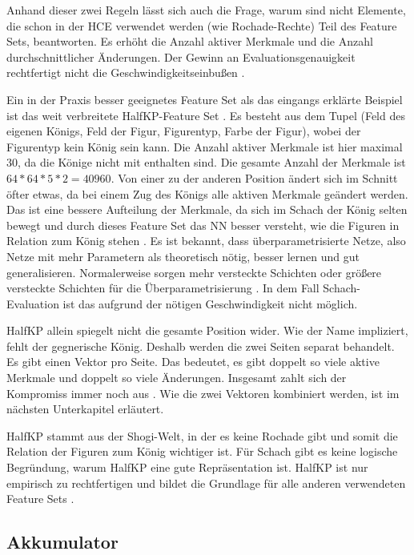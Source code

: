 Anhand dieser zwei Regeln lässt sich auch die Frage, warum sind nicht Elemente, die schon in der \ac{HCE} verwendet werden (wie \zb{} Rochade-Rechte) Teil des Feature Sets, beantworten. Es erhöht die Anzahl aktiver Merkmale und die Anzahl durchschnittlicher Änderungen. Der Gewinn an Evaluationsgenauigkeit rechtfertigt nicht die Geschwindigkeitseinbußen \cite{StockfishNNUE}.

Ein in der Praxis besser geeignetes Feature Set als das eingangs erklärte Beispiel ist das weit verbreitete HalfKP-Feature Set \cite{YNasu2018,StockfishNNUE}. Es besteht aus dem Tupel (Feld des eigenen Königs, Feld der Figur, Figurentyp, Farbe der Figur), wobei der Figurentyp kein König sein kann. Die Anzahl aktiver Merkmale ist hier maximal 30, da die Könige nicht mit enthalten sind. Die gesamte Anzahl der Merkmale ist $64*64*5*2=40960$. Von einer zu der anderen Position ändert sich im Schnitt öfter etwas, da bei einem Zug des Königs alle aktiven Merkmale geändert werden. Das ist eine bessere Aufteilung der Merkmale, da sich im Schach der König selten bewegt und durch dieses Feature Set das \ac{NN} besser versteht, wie die Figuren in Relation zum König stehen \cite{StockfishNNUE}. Es ist bekannt, dass überparametrisierte Netze, also Netze mit mehr Parametern als theoretisch nötig, besser lernen und gut generalisieren. Normalerweise sorgen mehr versteckte Schichten oder größere versteckte Schichten für die Überparametrisierung \cite{Du2018, allen2019learning}. In dem Fall Schach-Evaluation ist das aufgrund der nötigen Geschwindigkeit nicht möglich.

HalfKP allein spiegelt nicht die gesamte Position wider. Wie der Name impliziert, fehlt der gegnerische König. Deshalb werden die zwei Seiten separat behandelt. Es gibt einen Vektor pro Seite. Das bedeutet, es gibt doppelt so viele aktive Merkmale und doppelt so viele Änderungen. Insgesamt zahlt sich der Kompromiss immer noch aus \cite{StockfishNNUE}. Wie die zwei Vektoren kombiniert werden, ist im nächsten Unterkapitel erläutert.

HalfKP stammt aus der Shogi-Welt, in der es keine Rochade gibt und somit die Relation der Figuren zum König wichtiger ist. Für Schach gibt es keine logische Begründung, warum HalfKP eine gute Repräsentation ist. HalfKP ist nur empirisch zu rechtfertigen und bildet die Grundlage für alle anderen verwendeten Feature Sets \cite{StockfishNNUE}.

\subsection{Akkumulator}
\label{chap:accumulator}

